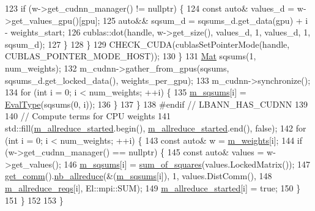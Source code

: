 \begin{DoxyCode}
123         \textcolor{keywordflow}{if} (w->get\_cudnn\_manager() != \textcolor{keyword}{nullptr}) \{
124           \textcolor{keyword}{const} \textcolor{keyword}{auto}& values\_d = w->get\_values\_gpu()[gpu];
125           \textcolor{keyword}{auto}&& sqsum\_d = sqsums\_d.get\_data(gpu) + i - weights\_start;
126           cublas::dot(handle, w->get\_size(), values\_d, 1, values\_d, 1, sqsum\_d);
127         \}
128       \}
129       CHECK\_CUDA(cublasSetPointerMode(handle, CUBLAS\_POINTER\_MODE\_HOST));
130     \}
131     \hyperlink{base_8hpp_a68f11fdc31b62516cb310831bbe54d73}{Mat} sqsums(1, num\_weights);
132     m\_cudnn->gather\_from\_gpus(sqsums, sqsums\_d.get\_locked\_data(), weights\_per\_gpu);
133     m\_cudnn->synchronize();
134     \textcolor{keywordflow}{for} (\textcolor{keywordtype}{int} i = 0; i < num\_weights; ++i) \{
135       \hyperlink{classlbann_1_1l2__weight__regularization_a628aabb4e824f2aa861baba93668dc24}{m\_sqsums}[i] = \hyperlink{base_8hpp_a3266f5ac18504bbadea983c109566867}{EvalType}(sqsums(0, i));
136     \}
137   \}
138 \textcolor{preprocessor}{#endif // LBANN\_HAS\_CUDNN}
139 
140   \textcolor{comment}{// Compute terms for CPU weights}
141   std::fill(\hyperlink{classlbann_1_1l2__weight__regularization_a0ae4858adb3279c0019f5e0500bdcf4f}{m\_allreduce\_started}.begin(), \hyperlink{classlbann_1_1l2__weight__regularization_a0ae4858adb3279c0019f5e0500bdcf4f}{m\_allreduce\_started}.end(), \textcolor{keyword}{
      false});
142   \textcolor{keywordflow}{for} (\textcolor{keywordtype}{int} i = 0; i < num\_weights; ++i) \{
143     \textcolor{keyword}{const} \textcolor{keyword}{auto}& w = \hyperlink{classlbann_1_1objective__function__term_a1d601c29153ae9cb54c585887608f2bf}{m\_weights}[i];
144     \textcolor{keywordflow}{if} (w->get\_cudnn\_manager() == \textcolor{keyword}{nullptr}) \{
145       \textcolor{keyword}{const} \textcolor{keyword}{auto}& values = w->get\_values();
146       \hyperlink{classlbann_1_1l2__weight__regularization_a628aabb4e824f2aa861baba93668dc24}{m\_sqsums}[i] = \hyperlink{namespaceanonymous__namespace_02l2_8cpp_03_a32724e48048319cd99337131ba70d4c4}{sum\_of\_squares}(values.LockedMatrix());
147       \hyperlink{classlbann_1_1objective__function__term_a5f89b676a26a6b76ddc26563ac87beb9}{get\_comm}().\hyperlink{classlbann_1_1lbann__comm_a2a7bb6cf3707366fc0671d8894ca30ea}{nb\_allreduce}(&(\hyperlink{classlbann_1_1l2__weight__regularization_a628aabb4e824f2aa861baba93668dc24}{m\_sqsums}[i]), 1, values.DistComm(),
148                               \hyperlink{classlbann_1_1l2__weight__regularization_adf7350e151736d9bae4aa5cf410acd80}{m\_allreduce\_reqs}[i], El::mpi::SUM);
149       \hyperlink{classlbann_1_1l2__weight__regularization_a0ae4858adb3279c0019f5e0500bdcf4f}{m\_allreduce\_started}[i] = \textcolor{keyword}{true};
150     \}
151   \}
152 
153 \}
\end{DoxyCode}
